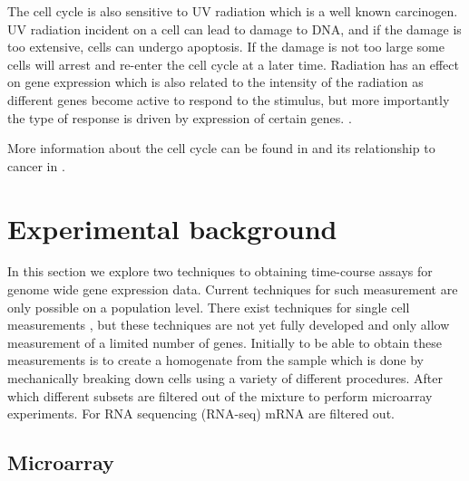 The cell cycle is also sensitive to UV radiation which is a well known carcinogen. UV radiation incident on a cell can lead to damage to DNA, and if the damage is too extensive, cells can undergo apoptosis. If the damage is not too large some cells will arrest and re-enter the cell cycle at a later time. Radiation has an effect on gene expression which is also related to the intensity of the radiation as different genes become active to respond to the stimulus, but more importantly the type of response is driven by expression of certain genes. \citep{Gentile:2003in}.

More information about the cell cycle can be found in \citet[Chapter~17]{Alberts:2007tv} and its relationship to cancer in \citet[Chapter~8]{Weinberg:2013uu}.


\section{Experimental background}
\label{sec:exper-backgr}

In this section we explore two techniques to obtaining time-course assays for genome wide gene expression data. Current techniques for such measurement are only possible on a population level. There exist techniques for single cell measurements \citep{Buganim:2012hp}, but these techniques are not yet fully developed and only allow measurement of a limited number of genes. Initially to be able to obtain these measurements is to create a homogenate from the sample which is done by mechanically breaking down cells using a variety of different procedures.  After which different subsets are filtered out of the mixture to perform microarray experiments.  For RNA sequencing (RNA-seq) mRNA are filtered out.

\subsection{Microarray}
\label{sec:microarray}

